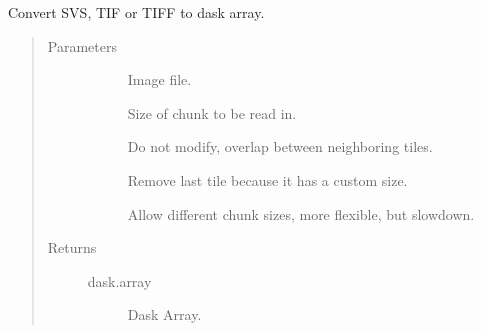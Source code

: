 \documentclass[letterpaper,10pt,english]{sphinxmanual}
\begin{document}
\begin{fulllineitems}
\label{\detokenize{index:pathflowai.utils.svs2dask_array}}
Convert SVS, TIF or TIFF to dask array.
\begin{quote}\begin{description}
\item[{Parameters}] \leavevmode\begin{description}
\item[{}] \leavevmode
Image file.

\item[{}] \leavevmode
Size of chunk to be read in.

\item[{}] \leavevmode
Do not modify, overlap between neighboring tiles.

\item[{}] \leavevmode
Remove last tile because it has a custom size.

\item[{}] \leavevmode
Allow different chunk sizes, more flexible, but slowdown.

\end{description}

\item[{Returns}] \leavevmode\begin{description}
\item[{dask.array}] \leavevmode
Dask Array.

\end{description}

\begin{sphinxVerbatim}[commandchars=\\\{\}]
    
\end{sphinxVerbatim}


\end{description}
\end{quote}
\end{fulllineitems}
\end{document}
